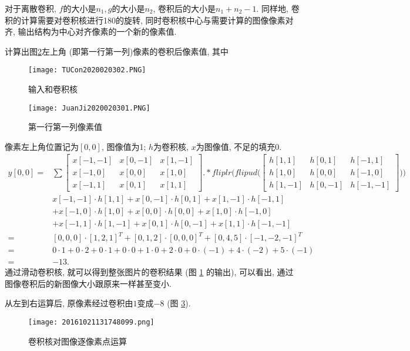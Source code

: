 对于离散卷积, $f$的大小是$n_1, g$的大小是$n_2$, 卷积后的大小是$n_1+n_2-1$.
同样地, 卷积的计算需要对卷积核进行180的旋转, 同时卷积核中心与需要计算的图像像素对齐, 输出结构为中心对齐像素的一个新的像素值.
\begin{example}
计算出图\ref{JuanJi2020020301}左上角 (即第一行第一列)像素的卷积后像素值, 其中
\begin{figure}[H]
\centering
\texttt{[image: TUCon2020020302.PNG]}
\caption{输入和卷积核}
\label{TUCon2020020302}
\end{figure}
\begin{figure}[H]
\centering
\texttt{[image: JuanJi2020020301.PNG]}
\caption{第一行第一列像素值}
\label{JuanJi2020020301}
\end{figure}
像素左上角位置记为$[0,0]$, 图像值为1; $h$为卷积核, $x$为图像值, 不足的填充0.
$$
\begin{aligned}
y[0,0]=&\sum\begin{bmatrix}
  x[-1,-1]&x[0,-1]&x[1,-1]\\
  x[-1,0] &x[0,0]&x[1,0]\\
  x[-1,1]&x[0,1] &x[1,1]
\end{bmatrix}.*
fliplr\Bigg(flipud\Big(\begin{bmatrix}
  h[1,1]&h[0,1]&h[-1,1]\\
  h[1,0]&h[0,0]&h[-1,0] \\
  h[1,-1]&h[0,-1]& h[-1,-1]
\end{bmatrix}\Big)\Bigg)\\
& x[-1,-1] \cdot h[1,1]+x[0,-1] \cdot h[0,1]+x[1,-1] \cdot h[-1,1] \\
       &+x[-1,0] \cdot h[1,0]+x[0,0] \cdot h[0,0]+x[1,0] \cdot h[-1,0] \\
       &+x[-1,1] \cdot h[1,-1]+x[0,1] \cdot h[0,-1]+x[1,1] \cdot h[-1,-1] \\
      =&[0,0,0]\cdot [1,2,1]^T+[0,1,2]\cdot [0,0,0]^T+[0,4,5]\cdot [-1,-2,-1]^T\\
      =& 0\cdot 1+0 \cdot 2+0 \cdot 1+0 \cdot 0+1 \cdot 0+2 \cdot 0+0 \cdot (-1)+4 \cdot (-2)+5 \cdot (-1)\\
      =&-13.
\end{aligned}$$
通过滑动卷积核, 就可以得到整张图片的卷积结果 (图 \ref{TUCon2020020302} 的输出), 可以看出, 通过图像卷积后的新图像大小跟原来一样甚至变小.
\vspace{-0.4cm}
\end{example}

\begin{example}
从左到右运算后, 原像素经过卷积由$1$变成$-8$ (图 \ref{CNN20161021131748099}).
\begin{figure}[H]
\centering
\texttt{[image: 20161021131748099.png]}
\caption{卷积核对图像逐像素点运算}
\label{CNN20161021131748099}
\end{figure}
\vspace{-0.4cm}
\end{example}

